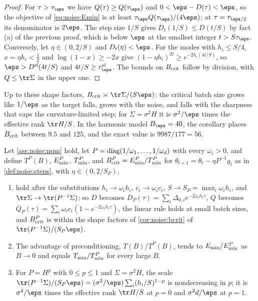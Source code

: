 \begin{refsection}
\begin{proof}
For $\tau>\tau_\eps$ we have $Q(\tau)\ge Q(\tau_\eps)$ and $0<\eps-D(\tau)<\eps$, so the objective of \eqref{eq:noise:Emin} is at least $\tau_\eps Q(\tau_\eps)/(4\eps)$; at $\tau=\tau_{\eps/2}$ its denominator is $2\eps$. The step size $1/S$ gives $D_t(1/S)\le D(t/S)$ by fact (a) of the previous proof, which is below $\eps$ at the smallest integer $t>S\tau_\eps$. Conversely, let $\eta\in(0,2/S)$ and $D_t(\eta)<\eps$. For the modes with $h_i\le S/4$, $x=\eta h_i<\frac12$ and $\log(1-x)\ge-2x$ give $(1-\eta h_i)^{2t}\ge e^{-2h_i(4t/S)}$, so $\eps>D^\noisesl(4t/S)$ and $4t/S\ge\tau^\noisesl_\eps$. The bounds on $B_{\mathrm{crit}}$ follow by division, with $Q\le\tr\Sigma$ in the upper one.
\end{proof}

Up to these shape factors, $\noiseBcrit\asymp\tr\Sigma/(S\eps)$: the critical batch size grows like $1/\eps$ as the target falls, grows with the noise, and falls with the sharpness that caps the curvature-limited step; for $\Sigma=\sigma^2H$ it is $\sigma^2/\eps$ times the effective rank $\tr H/S$. In the harmonic model $\noiseBeps=40$, the corollary places $B_{\mathrm{crit}}$ between $9.5$ and $125$, and the exact value is $9987/177=56$.

\begin{theorem}\label{thm:noise:precond}
Let \cref{ass:noise:nqm} hold, let $P=\operatorname{diag}(1/\omega_1,\dots,1/\omega_d)$ with every $\omega_i>0$, and define $T^P(B)$, $E_{\min}^P$, $T_{\min}^P$, and $B_{\mathrm{crit}}^P=E_{\min}^P/T_{\min}^P$ for $\theta_{t+1}=\theta_t-\eta P^{-1}g_t$ as in \cref{def:noise:steps}, with $\eta\in(0,2/S_P)$.
\begin{enumerate}
\item {} hold after the substitutions $h_i\to\omega_ih_i$, $c_i\to\omega_ic_i$, $S\to S_P=\max_i\omega_ih_i$, and $\tr\Sigma\to\tr(P^{-1}\Sigma)$; so $D$ becomes $D_P(\tau)=\sum_i\Delta_{0,i}e^{-2\omega_ih_i\tau}$, $Q$ becomes $Q_P(\tau)=\sum_i\omega_ic_i(1-e^{-2\omega_ih_i\tau})$, the linear rule holds at small batch sizes, and $B_{\mathrm{crit}}^P$ is within the shape factors of \cref{cor:noise:bcrit} of $\tr(P^{-1}\Sigma)/(S_P\eps)$.
\item The advantage of preconditioning, $T(B)/T^P(B)$, tends to $E_{\min}/E_{\min}^P$ as $B\to0$ and equals $T_{\min}/T_{\min}^P$ for every large $B$.
\item For $P=H^p$ with $0\le p\le1$ and $\Sigma=\sigma^2H$, the scale $\tr(P^{-1}\Sigma)/(S_P\eps)=(\sigma^2/\eps)\sum_i(h_i/S)^{1-p}$ is nondecreasing in $p$; it is $\sigma^2/\eps$ times the effective rank $\tr H/S$ at $p=0$ and $\sigma^2d/\eps$ at $p=1$.
\end{enumerate}
\end{theorem}


\end{refsection}
